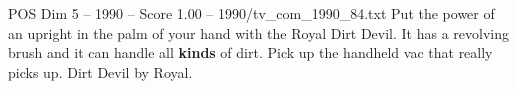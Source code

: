 \begin{textsample}{POS Dim 5 – 1990 – Score 1.00 – 1990/tv\_com\_1990\_84.txt}  \label{ex:f5_pos_027}
Put the power of an upright in the palm of your hand with the Royal Dirt Devil.
It has a revolving brush and it can handle all \textbf{kinds} of dirt.
Pick up the handheld vac that really picks up.
Dirt Devil by Royal.

\end{textsample}
